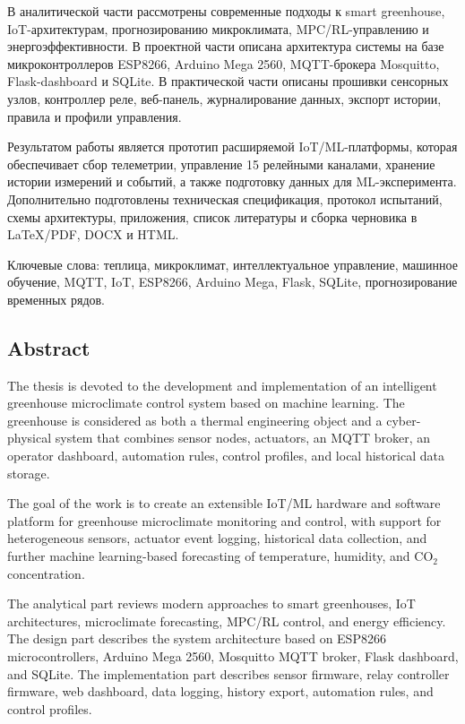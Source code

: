 \documentclass[a4paper,14pt]{extarticle}
\begin{document}
В аналитической части рассмотрены современные подходы к smart
greenhouse, IoT-архитектурам, прогнозированию микроклимата,
MPC/RL-управлению и энергоэффективности. В проектной части описана
архитектура системы на базе микроконтроллеров ESP8266, Arduino Mega
2560, MQTT-брокера Mosquitto, Flask-dashboard и SQLite. В практической
части описаны прошивки сенсорных узлов, контроллер реле, веб-панель,
журналирование данных, экспорт истории, правила и профили управления.

Результатом работы является прототип расширяемой IoT/ML-платформы,
которая обеспечивает сбор телеметрии, управление 15 релейными каналами,
хранение истории измерений и событий, а также подготовку данных для
ML-эксперимента. Дополнительно подготовлены техническая спецификация,
протокол испытаний, схемы архитектуры, приложения, список литературы и
сборка черновика в LaTeX/PDF, DOCX и HTML.

Ключевые слова: теплица, микроклимат, интеллектуальное управление,
машинное обучение, MQTT, IoT, ESP8266, Arduino Mega, Flask, SQLite,
прогнозирование временных рядов.

\subsection{Abstract}\label{abstract}

The thesis is devoted to the development and implementation of an
intelligent greenhouse microclimate control system based on machine
learning. The greenhouse is considered as both a thermal engineering
object and a cyber-physical system that combines sensor nodes,
actuators, an MQTT broker, an operator dashboard, automation rules,
control profiles, and local historical data storage.

The goal of the work is to create an extensible IoT/ML hardware and
software platform for greenhouse microclimate monitoring and control,
with support for heterogeneous sensors, actuator event logging,
historical data collection, and further machine learning-based
forecasting of temperature, humidity, and CO\(_2\) concentration.

The analytical part reviews modern approaches to smart greenhouses, IoT
architectures, microclimate forecasting, MPC/RL control, and energy
efficiency. The design part describes the system architecture based on
ESP8266 microcontrollers, Arduino Mega 2560, Mosquitto MQTT broker,
Flask dashboard, and SQLite. The implementation part describes sensor
firmware, relay controller firmware, web dashboard, data logging,
history export, automation rules, and control profiles.
\end{document}
